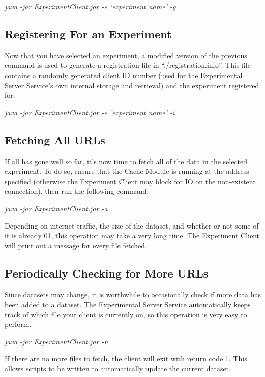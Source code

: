 \documentclass[letterpaper]{article}
\begin{document}
\begin{addmargin}[1em]{2em}
\textit{java -jar ExperimentClient.jar -e `experiment name' -g}
\end{addmargin}

\subsection{Registering For an Experiment}
Now that you have selected an experiment, a modified version of the previous command is used to generate a registration file in ``./registration.info''. This file contains a randomly generated client ID number (used for the Experimental Server Service's own internal storage and retrieval) and the experiment registered for. 

\begin{addmargin}[1em]{2em}
\textit{java -jar ExperimentClient.jar -e 'experiment name' -i}
\end{addmargin}

\subsection{Fetching All URLs}
If all has gone well so far, it's now time to fetch all of the data in the selected experiment. To do so, ensure that the Cache Module is running at the address specified (otherwise the Experiment Client may block for IO on the non-existent connection), then run the following command:

\begin{addmargin}[1em]{2em}
\textit{java -jar ExperimentClient.jar -a}
\end{addmargin}

Depending on internet traffic, the size of the dataset, and whether or not some of it is already 01, this operation may take a very long time. The Experiment Client will print out a message for every file fetched.

\subsection{Periodically Checking for More URLs}
Since datasets may change, it is worthwhile to occasionally check if more data has been added to a dataset. The Experimental Server Service automatically keeps track of which file your client is currently on, so this operation is very easy to perform.

\begin{addmargin}[1em]{2em}
\textit{java -jar ExperimentClient.jar -n}
\end{addmargin}

If there are no more files to fetch, the client will exit with return code 1. This allows scripts to be written to automatically update the current dataset.
\end{document}
